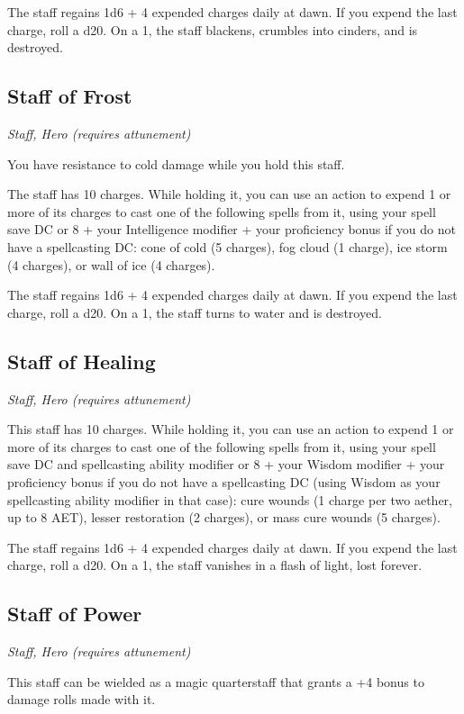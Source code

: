 The staff regains 1d6 + 4 expended charges daily at dawn. If you expend the last charge, roll a d20. On a 1, the staff blackens, crumbles into cinders, and is destroyed.

\subsection{Staff of Frost}
\textit{Staff, Hero (requires attunement)}

You have resistance to cold damage while you hold this staff.

The staff has 10 charges. While holding it, you can use an action to expend 1 or more of its charges to cast one of the following spells from it, using your spell save DC or 8 + your Intelligence modifier + your proficiency bonus if you do not have a spellcasting DC: cone of cold (5 charges), fog cloud (1 charge), ice storm (4 charges), or wall of ice (4 charges).

The staff regains 1d6 + 4 expended charges daily at dawn. If you expend the last charge, roll a d20. On a 1, the staff turns to water and is destroyed.

\subsection{Staff of Healing}
\textit{Staff, Hero (requires attunement)}

This staff has 10 charges. While holding it, you can use an action to expend 1 or more of its charges to cast one of the following spells from it, using your spell save DC and spellcasting ability modifier or 8 + your Wisdom modifier + your proficiency bonus if you do not have a spellcasting DC (using Wisdom as your spellcasting ability modifier in that case): cure wounds (1 charge per two aether, up to 8 AET), lesser restoration (2 charges), or mass cure wounds (5 charges).

The staff regains 1d6 + 4 expended charges daily at dawn. If you expend the last charge, roll a d20. On a 1, the staff vanishes in a flash of light, lost forever.

\subsection{Staff of Power}
\textit{Staff, Hero (requires attunement)}

This staff can be wielded as a magic quarterstaff that grants a +4 bonus to damage rolls made with it.

